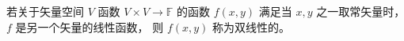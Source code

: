 

若关于矢量空间 $V$ 函数 $V\times V \to \mathbb F$ 的函数 $f(x,y)$ 满足当 $x,y$ 之一取常矢量时， $f$ 是另一个矢量的线性函数， 则 $f(x, y)$ 称为双线性的。

















